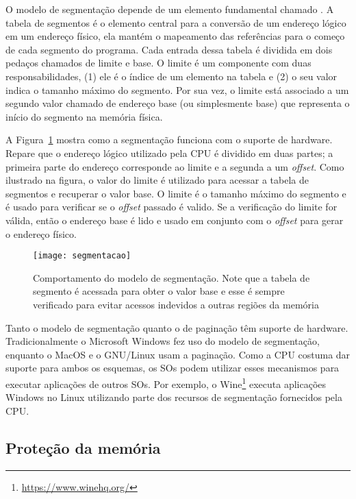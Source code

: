 O modelo de segmentação depende de um elemento fundamental chamado
. A tabela de segmentos é o elemento central
para a conversão de um endereço lógico em um endereço físico, ela mantém o
mapeamento das referências para o começo de cada segmento do programa. Cada
entrada dessa tabela é dividida em dois pedaços chamados de limite e base. O
limite é um componente com duas responsabilidades, (1) ele é o índice de um
elemento na tabela e (2) o seu valor indica o tamanho máximo do segmento. Por
sua vez, o limite está associado a um segundo valor chamado de endereço base
(ou simplesmente base) que representa o início do segmento na memória física.

A Figura~\ref{fig:segmentacao} mostra como a segmentação funciona com o suporte
de hardware. Repare que o endereço lógico utilizado pela CPU é dividido em duas
partes; a primeira parte do endereço corresponde ao limite e a segunda a um
\emph{offset}. Como ilustrado na figura, o valor do limite é utilizado para
acessar a tabela de segmentos e recuperar o valor base. O limite é o tamanho
máximo do segmento e é usado para verificar se o \emph{offset} passado é
valido. Se a verificação do limite for válida, então o endereço base é lido e
usado em conjunto com o \emph{offset} para gerar o endereço físico.

\begin{figure}[!h]
  \centering
  \texttt{[image: segmentacao]} 
  \caption{Comportamento do modelo de segmentação. Note que a tabela de segmento é acessada para obter o valor base e esse é sempre verificado para evitar acessos indevidos a outras regiões da memória}
  \label{fig:segmentacao} 
\end{figure}

Tanto o modelo de segmentação quanto o de paginação têm suporte de hardware.
Tradicionalmente o Microsoft Windows fez uso do modelo de segmentação, enquanto
o MacOS e o GNU/Linux usam a paginação. Como a CPU costuma dar suporte para
ambos os esquemas, os SOs podem utilizar esses mecanismos para executar
aplicações de outros SOs. Por exemplo, o
Wine\footnote{\url{https://www.winehq.org/}} executa aplicações Windows no
Linux utilizando parte dos recursos de segmentação fornecidos pela CPU.

\subsection{Proteção da memória}
\label{sec:outros_mecanismos_memoria}

